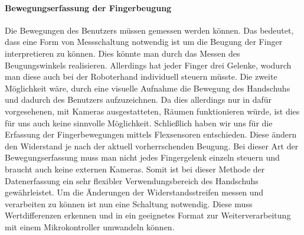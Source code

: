 \documentclass[titlepage,12pt,twoside]{article}
\begin{document}
\paragraph{Bewegungserfassung der Fingerbeugung}
\hfill \break
\hfill \break
Die Bewegungen des Benutzers müssen gemessen werden können. Das bedeutet, dass eine Form von Messschaltung notwendig ist um die  
Beugung der Finger interpretieren zu können. Dies könnte man durch das Messen des Beugungswinkels realisieren. Allerdings hat 
jeder Finger drei Gelenke, wodurch man diese auch bei der Roboterhand individuell steuern müsste. Die zweite Möglichkeit wäre, 
durch eine visuelle Aufnahme die Bewegung des Handschuhs und dadurch des Benutzers aufzuzeichnen. Da dies allerdings nur in dafür vorgesehenen, 
mit Kameras ausgestatteten, Räumen funktionieren würde, ist dies für uns auch keine sinnvolle Möglichkeit. Schließlich haben 
wir uns für die Erfassung der Fingerbewegungen mittels Flexsensoren entschieden. Diese ändern den Widerstand je nach der 
aktuell vorherrschenden Beugung. Bei dieser Art der Bewegungserfassung muss man nicht jedes Fingergelenk einzeln steuern und 
braucht auch keine externen Kameras. Somit ist bei dieser Methode der Datenerfassung ein sehr flexibler Verwendungsbereich 
des Handschuhs gewährleistet. Um die Änderungen der Widerstandsstreifen messen und verarbeiten zu können ist nun eine Schaltung 
notwendig. Diese muss Wertdifferenzen erkennen und in ein geeignetes Format zur Weiterverarbeitung mit einem Mikrokontroller
umwandeln können. \\
\\
\end{document}
